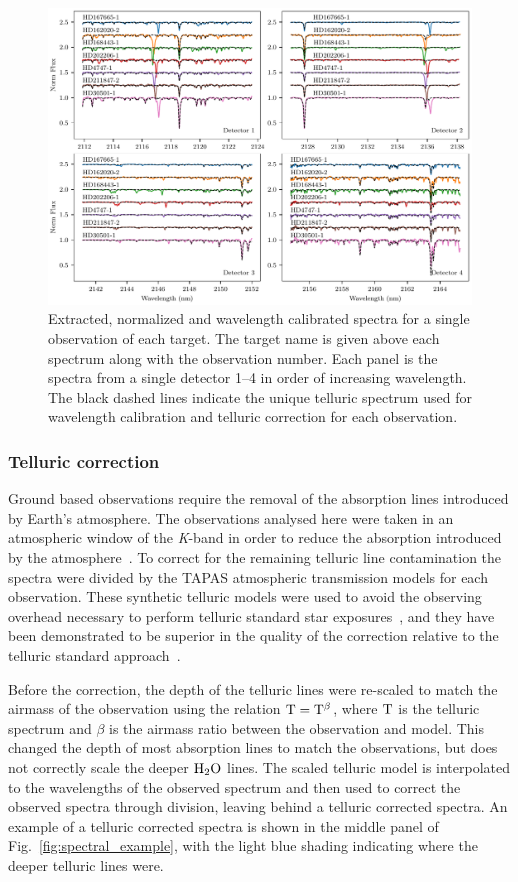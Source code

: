 \documentclass[fleqn,usenatbib]{mnras}
\begin{document}
\begin{figure}
    \includegraphics[width=0.8\hsize]{images/fig2.pdf}
    \caption{Extracted, normalized and wavelength calibrated spectra for a single observation of each target. The target name is given above each spectrum along with the observation number. Each panel is the spectra from a single detector 1--4 in order of increasing wavelength. The black dashed lines indicate the unique telluric spectrum used for wavelength calibration and telluric correction for each observation.}
    \label{fig:detector4allspectra}
\end{figure}

\subsubsection{Telluric correction}
\label{subsec:telluric_correction}
Ground based observations require the removal of the absorption lines introduced by Earth's atmosphere. The observations analysed here were taken in an atmospheric window of the \textit{K}-band in order to reduce the absorption introduced by the atmosphere~\citep{barnes_hd_2008}. To correct for the remaining telluric line contamination the spectra were divided by the TAPAS\citep{bertaux_tapas_2014} atmospheric transmission models for each observation. These synthetic telluric models were used to avoid the observing overhead necessary to perform telluric standard star exposures~\citep{vacca_method_2003}, and they have been demonstrated to be superior in the quality of the correction relative to the telluric standard approach~\citep[e.g.][]{cotton_atmospheric_2014}.

Before the correction, the depth of the telluric lines were re-scaled to match the airmass of the observation using the relation \(\rm T = T^{\beta}\), where \(\rm T\) is the telluric spectrum and \(\beta\) is the airmass ratio between the observation and model. This changed the depth of most absorption lines to match the observations, but does not correctly scale the deeper \(\rm H_{2}O\) lines. The scaled telluric model is interpolated to the wavelengths of the observed spectrum and then used to correct the observed spectra through division, leaving behind a telluric corrected spectra. An example of a telluric corrected spectra is shown in the middle panel of Fig.~\ref{fig:spectral_example}, with the light blue shading indicating where the deeper telluric lines were.
\end{document}

